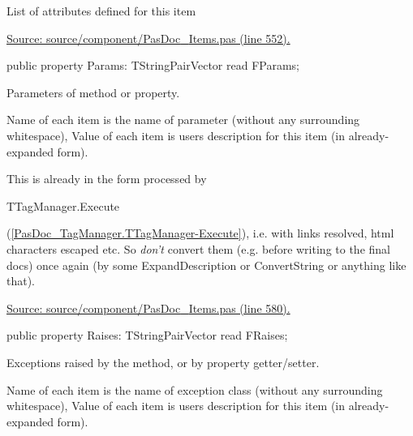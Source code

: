 \documentclass{report}
\newif\ifpdf
\begin{document}
\begin{list}{}
\begin{flushleft}
\ifpdf
\end{flushleft}
\fi


\par List of attributes defined for this item\par
\href{https://github.com/pasdoc/pasdoc/blob/master/source/component/PasDoc_Items.pas#L552}{Source: source/component/PasDoc{\_}Items.pas (line 552).}\label{PasDoc_Items.TPasItem-Params}
\item[\textbf{Params}\hfill]
\ifpdf
\begin{flushleft}
\fi
\begin{ttfamily}
public property Params: TStringPairVector read FParams;\end{ttfamily}

\ifpdf
\end{flushleft}
\fi


\par Parameters of method or property.

Name of each item is the name of parameter (without any surrounding whitespace), Value of each item is users description for this item (in already{-}expanded form).

This is already in the form processed by \begin{ttfamily}TTagManager.Execute\end{ttfamily}(\ref{PasDoc_TagManager.TTagManager-Execute}), i.e. with links resolved, html characters escaped etc. So \textit{don't} convert them (e.g. before writing to the final docs) once again (by some ExpandDescription or ConvertString or anything like that).\par
\href{https://github.com/pasdoc/pasdoc/blob/master/source/component/PasDoc_Items.pas#L580}{Source: source/component/PasDoc{\_}Items.pas (line 580).}\label{PasDoc_Items.TPasItem-Raises}
\item[\textbf{Raises}\hfill]
\ifpdf
\begin{flushleft}
\fi
\begin{ttfamily}
public property Raises: TStringPairVector read FRaises;\end{ttfamily}

\ifpdf
\end{flushleft}
\fi


\par Exceptions raised by the method, or by property getter/setter.

Name of each item is the name of exception class (without any surrounding whitespace), Value of each item is users description for this item (in already{-}expanded form).


\end{list}
\end{document}

